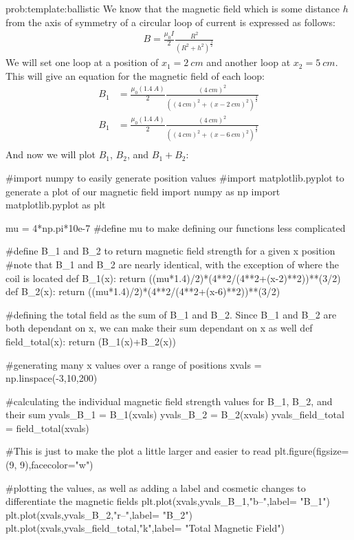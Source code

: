 \begin{solution}{prob:template:ballistic}\label{soln:template:ballistic}
	We know that the magnetic field which is some distance $h$ from the axis of symmetry of a circular loop of current is expressed as follows:
	\begin{align*}
	B = \frac{\mu_0 I}{2}\frac{R^2}{(R^2+h^2)^{\frac{3}{2}}}
	\end{align*}
	We will set one loop at a position of $x_1=\SI{2}{cm}$ and another loop at $x_2 = \SI{5}{cm}$. This will give an equation for the magnetic field of each loop:
	\begin{align*}
	B_1 &= \frac{\mu_0 (\SI{1.4}{A})}{2}\frac{(\SI{4}{cm})^2}{((\SI{4}{cm})^2+(x-\SI{2}{cm})^2)^{\frac{3}{2}}}\\
	B_1 &= \frac{\mu_0 (\SI{1.4}{A})}{2}\frac{(\SI{4}{cm})^2}{((\SI{4}{cm})^2+(x-\SI{6}{cm})^2)^{\frac{3}{2}}}\\
	\end{align*}
	And now we will plot $B_1$, $B_2$, and $B_1 + B_2$:
	
	\begin{python}[caption=Numerical integration of a function] 
	#import numpy to easily generate position values
	#import matplotlib.pyplot to generate a plot of our magnetic field
	import numpy as np
	import matplotlib.pyplot as plt
	
	mu = 4*np.pi*10e-7 #define mu to make defining our functions less complicated
	
	#define B_1 and B_2 to return magnetic field strength for a given x position
	#note that B_1 and B_2 are nearly identical, with the exception of where the coil is located
	def B_1(x):
	return ((mu*1.4)/2)*(4**2/(4**2+(x-2)**2))**(3/2)
	def B_2(x):
	return ((mu*1.4)/2)*(4**2/(4**2+(x-6)**2))**(3/2)
	
	#defining the total field as the sum of B_1 and B_2. Since B_1 and B_2 are both dependant on x, we can make their sum dependant on x as well
	def field_total(x):
	return (B_1(x)+B_2(x))
	
	#generating many x values over a range of positions
	xvals = np.linspace(-3,10,200)
	
	#calculating the individual magnetic field strength values for B_1, B_2, and their sum
	yvals_B_1 = B_1(xvals)
	yvals_B_2 = B_2(xvals)
	yvals_field_total = field_total(xvals)
	
	#This is just to make the plot a little larger and easier to read
	plt.figure(figsize=(9, 9),facecolor="w")
	
	#plotting the values, as well as adding a label and cosmetic changes to differentiate the magnetic fields
	plt.plot(xvals,yvals_B_1,"b--",label= "B_1")
	plt.plot(xvals,yvals_B_2,"r--",label= "B_2")
	plt.plot(xvals,yvals_field_total,"k",label= "Total Magnetic Field")
	

\end{python}
\end{solution}
